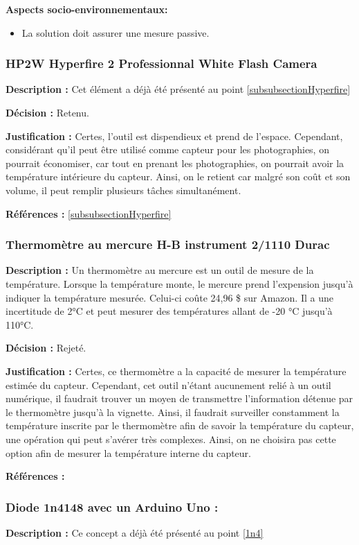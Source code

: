 \textbf{Aspects socio-environnementaux:}
\begin{itemize}[label = {--}]
    \item La solution doit assurer une mesure passive.
\end{itemize}

\subsubsection{HP2W Hyperfire 2 Professionnal White Flash Camera}
\textbf{Description :} Cet élément a déjà été présenté au point \ref{subsubsectionHyperfire}

\textbf{Décision :} Retenu.

\textbf{Justification :} Certes, l'outil est dispendieux et prend de l'espace. Cependant, considérant qu'il peut être utilisé comme capteur pour les photographies, on pourrait économiser, car tout en prenant les photographies, on pourrait avoir la température intérieure du capteur. Ainsi, on le retient car malgré son coût et son volume, il peut remplir plusieurs tâches simultanément.

\textbf{Références :} \ref{subsubsectionHyperfire}

\subsubsection{Thermomètre au mercure H-B instrument 2/1110 Durac}
\textbf{Description :} Un thermomètre au mercure est un outil de mesure de la température. Lorsque la température monte, le mercure prend l'expension jusqu'à indiquer la température mesurée. Celui-ci coûte 24,96 \$ sur Amazon. Il a une incertitude de 2°C et peut mesurer des températures allant de -20 °C jusqu'à 110°C.

\textbf{Décision :} Rejeté.

\textbf{Justification :} Certes, ce thermomètre a la capacité de mesurer la température estimée du capteur. Cependant, cet outil n'étant aucunement relié à un outil numérique, il faudrait trouver un moyen de transmettre l'information détenue par le thermomètre jusqu'à la vignette. Ainsi, il faudrait surveiller constamment la température inscrite par le thermomètre afin de savoir la température du capteur, une opération qui peut s'avérer très complexes. Ainsi, on ne choisira pas cette option afin de mesurer la température interne du capteur.

\textbf{Références :} \cite{mercure}

\subsubsection{Diode 1n4148 avec un Arduino Uno :}
\textbf{Description :} Ce concept a déjà été présenté au point \ref{1n4}

